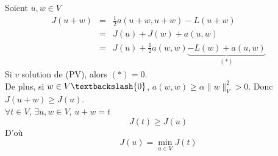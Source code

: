 
\begin{dem}
Soient $u,w\in V$
\begin{eqnarray*}
	J(u+w)&=&\frac{1}{2}a(u+w,u+w)-L(u+w)\\
		&=&J(u)+J(w)+a(u,w)\\
		&=&J(u)+\frac{1}{2}a(w,w)\underbrace{-L(w)+a(u,w)}_{(*)}
\end{eqnarray*}
Si $v$ solution de (PV), alors $(*)=0$.\\
De plus, si $w\in V\textbackslash\{0\}$, $a(w,w)\geq \alpha\|w\|^2_V >0$. Donc $J(u+w)\geq J(u)$.\\
$\forall t\in V$, $\exists u,w\in V$, $u+w=t$\\
	\[J(t)\geq J(u)\]
D'où \[J(u)=\min_{u\in V} J(t)\]
\end{dem}
